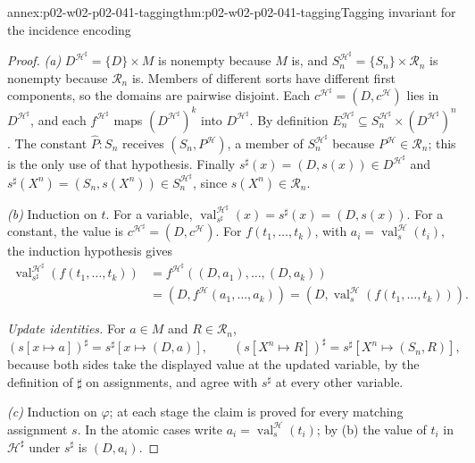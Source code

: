 \begin{annexitem}{annex:p02-w02-p02-041-tagging}{thm:p02-w02-p02-041-tagging}{Tagging invariant for the incidence encoding}
\begin{proof}
\emph{(a)}  \(D^{\mathcal H^\sharp}=\{D\}\times M\) is nonempty because
\(M\) is, and \(S_n^{\mathcal H^\sharp}=\{S_n\}\times\mathcal R_n\) is
nonempty because \(\mathcal R_n\) is.  Members of different sorts have
different first components, so the domains are pairwise disjoint.  Each
\(c^{\mathcal H^\sharp}=(D,c^{\mathcal H})\) lies in
\(D^{\mathcal H^\sharp}\), and each \(f^{\mathcal H^\sharp}\) maps
\((D^{\mathcal H^\sharp})^k\) into \(D^{\mathcal H^\sharp}\).  By definition
\(E_n^{\mathcal H^\sharp}\subseteq
S_n^{\mathcal H^\sharp}\times(D^{\mathcal H^\sharp})^n\).  The constant
\(\widehat P:S_n\) receives \((S_n,P^{\mathcal H})\), a member of
\(S_n^{\mathcal H^\sharp}\) because \(P^{\mathcal H}\in\mathcal R_n\); this
is the only use of that hypothesis.  Finally
\(s^\sharp(x)=(D,s(x))\in D^{\mathcal H^\sharp}\) and
\(s^\sharp(X^n)=(S_n,s(X^n))\in S_n^{\mathcal H^\sharp}\), since
\(s(X^n)\in\mathcal R_n\).

\emph{(b)}  Induction on \(t\).  For a variable,
\(\operatorname{val}^{\mathcal H^\sharp}_{s^\sharp}(x)=s^\sharp(x)=(D,s(x))\).
For a constant, the value is \(c^{\mathcal H^\sharp}=(D,c^{\mathcal H})\).
For \(f(t_1,\ldots,t_k)\), with \(a_i=\operatorname{val}^{\mathcal H}_s(t_i)\),
the induction hypothesis gives
\[
\begin{aligned}
 \operatorname{val}^{\mathcal H^\sharp}_{s^\sharp}(f(t_1,\ldots,t_k))
 &=f^{\mathcal H^\sharp}((D,a_1),\ldots,(D,a_k))\\
 &=(D,f^{\mathcal H}(a_1,\ldots,a_k))
 =(D,\operatorname{val}^{\mathcal H}_s(f(t_1,\ldots,t_k))).
\end{aligned}
\]

\emph{Update identities.}  For \(a\in M\) and \(R\in\mathcal R_n\),
\[
 (s[x\mapsto a])^\sharp=s^\sharp[x\mapsto(D,a)],
 \qquad
 (s[X^n\mapsto R])^\sharp=s^\sharp[X^n\mapsto(S_n,R)],
\]
because both sides take the displayed value at the updated variable, by the
definition of \(\sharp\) on assignments, and agree with \(s^\sharp\) at every
other variable.

\emph{(c)}  Induction on \(\varphi\); at each stage the claim is proved for
every matching assignment \(s\).  In the atomic cases write
\(a_i=\operatorname{val}^{\mathcal H}_s(t_i)\); by (b) the value of \(t_i\) in
\(\mathcal H^\sharp\) under \(s^\sharp\) is \((D,a_i)\).


\end{proof}
\end{annexitem}
